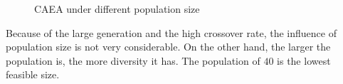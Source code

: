 \documentclass[a4paper, 11pt]{article}
\begin{document}
\begin{figure}[htb]
    \begin{center}
    \end{center}
    \caption{CAEA under different population size}
\end{figure}

\begin{flushleft}
Because of the large generation and the high crossover rate, the influence of population size is not very considerable.
On the other hand, the larger the population is, the more diversity it has. The population of $40$ is the lowest feasible
size.
\end{flushleft}
\end{document}
